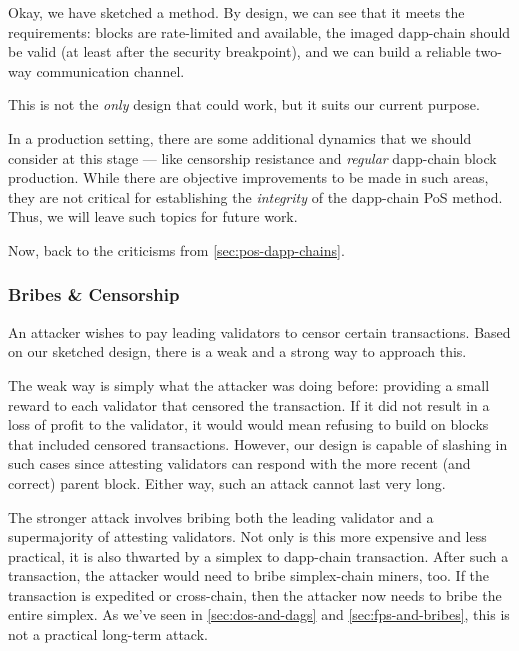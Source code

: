 
Okay, we have sketched a method.
By design, we can see that it meets the requirements: blocks are rate-limited and available, the imaged dapp-chain should be valid (at least after the security breakpoint), and we can build a reliable two-way communication channel.

This is not the \emph{only} design that could work, but it suits our current purpose.

In a production setting, there are some additional dynamics that we should consider at this stage --- like censorship resistance and \emph{regular} dapp-chain block production.
While there are objective improvements to be made in such areas, they are not critical for establishing the \emph{integrity} of the dapp-chain PoS method.
Thus, we will leave such topics for future work.

Now, back to the criticisms from \autoref{sec:pos-dapp-chains}.

\subsubsection{Bribes \& Censorship}

An attacker wishes to pay leading validators to censor certain transactions.
Based on our sketched design, there is a weak and a strong way to approach this.

The weak way is simply what the attacker was doing before: providing a small reward to each validator that censored the transaction.
If it did not result in a loss of profit to the validator, it would would mean refusing to build on blocks that included censored transactions.
However, our design is capable of slashing in such cases since attesting validators can respond with the more recent (and correct) parent block.
Either way, such an attack cannot last very long.

The stronger attack involves bribing both the leading validator and a supermajority of attesting validators.
Not only is this more expensive and less practical, it is also thwarted by a simplex to dapp-chain transaction.
After such a transaction, the attacker would need to bribe simplex-chain miners, too.
If the transaction is expedited or cross-chain, then the attacker now needs to bribe the entire simplex.
As we've seen in \autoref{sec:dos-and-dags} and \autoref{sec:fps-and-bribes}, this is not a practical long-term attack.

\subsubsection{\texorpdfstring{\ThePpeProblem}{The P + ε Problem}}

